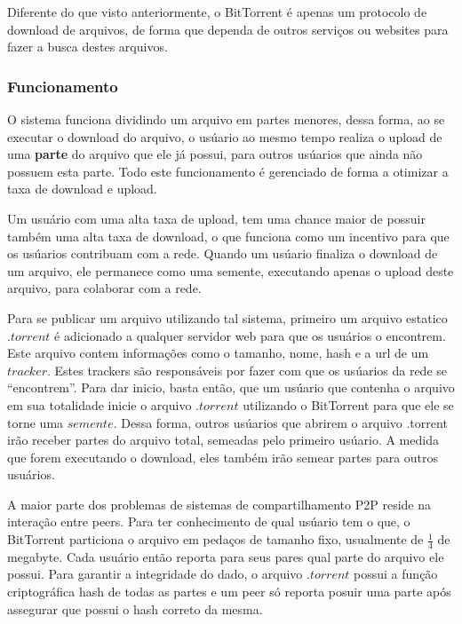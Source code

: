 \documentclass[a4paper]{article}
\begin{document}
Diferente do que visto anteriormente, o BitTorrent é apenas um protocolo de download de arquivos, de forma que dependa de outros serviços ou websites para fazer a busca destes arquivos\cite{pouwelsebit, CohenBIT}.

\subsubsection{Funcionamento}

O sistema funciona dividindo um arquivo em partes menores, dessa forma, ao se executar o download do arquivo, o usúario ao mesmo tempo realiza o upload de uma \textbf{parte} do arquivo que ele já possui, para outros usúarios que ainda não possuem esta parte. Todo este funcionamento é gerenciado de forma a otimizar a taxa de download e upload. 

Um usuário com uma alta taxa de upload, tem uma chance maior de possuir também uma alta taxa de download, o que funciona como um incentivo para que os usúarios contribuam com a rede. Quando um usúario finaliza o download de um arquivo, ele permanece como uma semente, executando apenas o upload deste arquivo, para colaborar com a rede. \cite{CohenBIT}

Para se publicar um arquivo utilizando tal sistema, primeiro um arquivo estatico $.torrent$ é adicionado a qualquer servidor web para que os usuários o encontrem. Este arquivo contem informações como o tamanho, nome, hash e a url de um $tracker$.  Estes trackers são responsáveis por fazer com que os usúarios da rede se ``encontrem''.  Para dar inicio, basta então, que um usúario que contenha o arquivo em sua totalidade inicie o arquivo $.torrent$ utilizando o BitTorrent para que ele se torne uma $semente$. Dessa forma, outros usúarios que abrirem o arquivo .torrent irão receber partes do arquivo total, semeadas pelo primeiro usúario. A medida que forem executando o download, eles também irão semear partes para outros usuários.\cite{CohenBIT}

A maior parte dos problemas de sistemas de compartilhamento P2P reside na interação entre peers. Para ter conhecimento de qual usúario tem o que, o BitTorrent particiona o arquivo em pedaços de tamanho fixo, usualmente de $\frac{1}{4}$ de megabyte. Cada usuário então reporta para seus pares qual parte do arquivo ele possui. Para garantir a integridade do dado, o arquivo $.torrent$ possui a função criptográfica hash de todas as partes e um peer só reporta posuir uma parte após assegurar que possui o hash correto da mesma.\cite{CohenBIT}
\end{document}
